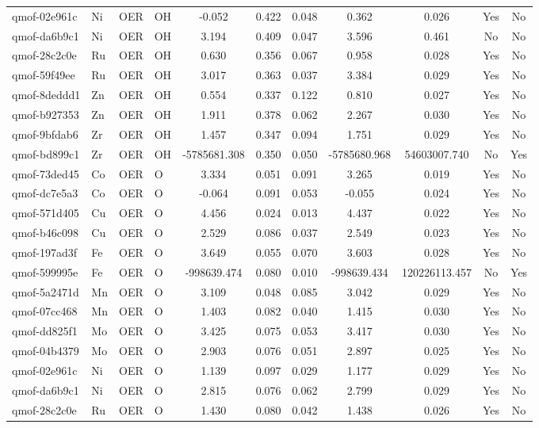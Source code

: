 {\begin{longtable}{llllccccccc}
qmof-02e961c & Ni & OER & OH & -0.052 & 0.422 & 0.048 & 0.362 & 0.026 & Yes & No \\
qmof-da6b9c1 & Ni & OER & OH & 3.194 & 0.409 & 0.047 & 3.596 & 0.461 & No & No \\
qmof-28c2c0e & Ru & OER & OH & 0.630 & 0.356 & 0.067 & 0.958 & 0.028 & Yes & No \\
qmof-59f49ee & Ru & OER & OH & 3.017 & 0.363 & 0.037 & 3.384 & 0.029 & Yes & No \\
qmof-8deddd1 & Zn & OER & OH & 0.554 & 0.337 & 0.122 & 0.810 & 0.027 & Yes & No \\
qmof-b927353 & Zn & OER & OH & 1.911 & 0.378 & 0.062 & 2.267 & 0.030 & Yes & No \\
qmof-9bfdab6 & Zr & OER & OH & 1.457 & 0.347 & 0.094 & 1.751 & 0.029 & Yes & No \\
qmof-bd899c1 & Zr & OER & OH & -5785681.308 & 0.350 & 0.050 & -5785680.968 & 54603007.740 & No & Yes \\
qmof-73ded45 & Co & OER & O & 3.334 & 0.051 & 0.091 & 3.265 & 0.019 & Yes & No \\
qmof-dc7e5a3 & Co & OER & O & -0.064 & 0.091 & 0.053 & -0.055 & 0.024 & Yes & No \\
qmof-571d405 & Cu & OER & O & 4.456 & 0.024 & 0.013 & 4.437 & 0.022 & Yes & No \\
qmof-b46c098 & Cu & OER & O & 2.529 & 0.086 & 0.037 & 2.549 & 0.023 & Yes & No \\
qmof-197ad3f & Fe & OER & O & 3.649 & 0.055 & 0.070 & 3.603 & 0.028 & Yes & No \\
qmof-599995e & Fe & OER & O & -998639.474 & 0.080 & 0.010 & -998639.434 & 120226113.457 & No & Yes \\
qmof-5a2471d & Mn & OER & O & 3.109 & 0.048 & 0.085 & 3.042 & 0.029 & Yes & No \\
qmof-07cc468 & Mn & OER & O & 1.403 & 0.082 & 0.040 & 1.415 & 0.030 & Yes & No \\
qmof-dd825f1 & Mo & OER & O & 3.425 & 0.075 & 0.053 & 3.417 & 0.030 & Yes & No \\
qmof-04b4379 & Mo & OER & O & 2.903 & 0.076 & 0.051 & 2.897 & 0.025 & Yes & No \\
qmof-02e961c & Ni & OER & O & 1.139 & 0.097 & 0.029 & 1.177 & 0.029 & Yes & No \\
qmof-da6b9c1 & Ni & OER & O & 2.815 & 0.076 & 0.062 & 2.799 & 0.029 & Yes & No \\
qmof-28c2c0e & Ru & OER & O & 1.430 & 0.080 & 0.042 & 1.438 & 0.026 & Yes & No \\

\end{longtable}}
